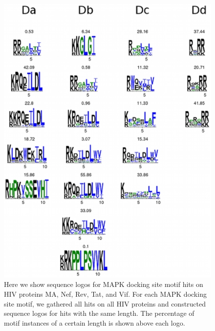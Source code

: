\begin{figure}
\begin{center}
\includegraphics[scale=0.7]{figs/plos1_3}
\end{center}
\caption[HIV Sequence logos]{\small Here we show sequence logos for
  MAPK docking site motif hits on HIV proteins MA, Nef, Rev, Tat, and
  Vif. For each MAPK docking site motif, we gathered all hits on all
  HIV proteins and constructed sequence logos for hits with the same
  length. The percentage of motif instances of a certain length is
  shown above each logo. \label{fig:plos1:fig3}}
\end{figure}

